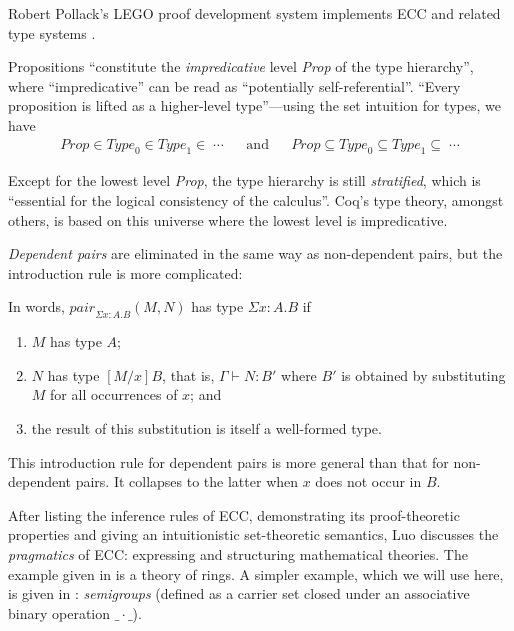 \documentclass[12pt,toc=bibliography,numbers=noendperiod,
               footnotes=multiple,twoside]{scrartcl}
\begin{document}
Robert Pollack's LEGO proof development system implements ECC and related type systems \autocite{pollack_theory_1994}.

Propositions \enquote{constitute the \emph{impredicative} level \textit{Prop} of the type hierarchy}, where \enquote{impredicative} can be read as \enquote{potentially self-referential}. \enquote{Every proposition is lifted as a higher-level type}---using the set intuition for types, we have
\begin{align*}
\textit{Prop} \in \textit{Type}_0 \in \textit{Type}_1 \in \;\cdots && \textrm{and} &&
\textit{Prop} \subseteq \textit{Type}_0 \subseteq \textit{Type}_1 \subseteq \;\cdots
\end{align*}

Except for the lowest level \textit{Prop}, the type hierarchy is still \emph{stratified}, which is \enquote{essential for the logical consistency of the calculus}. Coq's type theory, amongst others, is based on this universe where the lowest level is impredicative.

\emph{Dependent pairs} are eliminated in the same way as non-dependent pairs, but the introduction rule is more complicated:
\begin{prooftree}
\end{prooftree}

In words, \(\textit{pair}_{\Sigma x:A.B} (M,N)\) has type \(\Sigma x:A.B\) if

\begin{enumerate}
\item \(M\) has type \(A\);
\item \(N\) has type \([M/x] B\), that is, \(\Gamma \vdash N:B'\) where \(B'\) is obtained by substituting \(M\) for all occurrences of \(x\); and
\item the result of this substitution is itself a well-formed type.
\end{enumerate}

This introduction rule for dependent pairs is more general than that for non-dependent pairs. It collapses to the latter when \(x\) does not occur in \(B\).

After listing the inference rules of ECC, demonstrating its proof-theoretic properties and giving an intuitionistic set-theoretic semantics, Luo discusses the \textit{pragmatics} of ECC: expressing and structuring mathematical theories. The example given in \textcite{luo_ecc_1989} is a theory of rings. A simpler example, which we will use here, is given in \textcite{luo_extended_1990}: \emph{semigroups} (defined as a carrier set closed under an associative binary operation \(\_\cdot\_\)).
\end{document}
